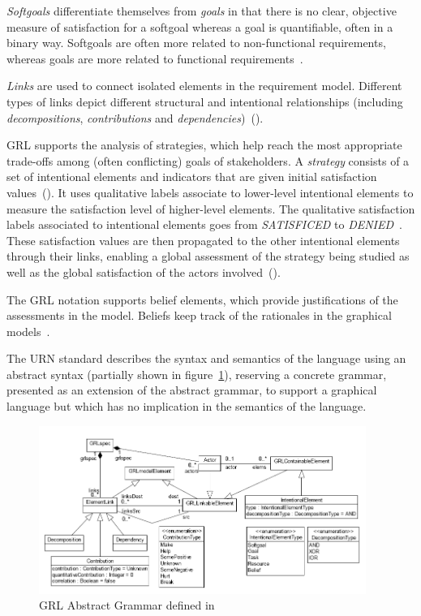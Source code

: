 \documentclass[dissertation,final]{softeng}
\begin{document}
\emph{Softgoals} differentiate themselves from \emph{goals} in that there is no clear, objective measure of satisfaction for a softgoal whereas a goal is quantifiable, often in a binary way. Softgoals are often more related to non-functional requirements, whereas goals are more related to functional requirements~\citep{amyot2011user}.

\emph{Links} are used to connect isolated elements in the requirement model. Different types of links depict different structural and intentional relationships (including \emph{decompositions}, \emph{contributions} and \emph{dependencies})~().

GRL supports the analysis of strategies, which help reach the most appropriate trade-offs among (often conflicting) goals of stakeholders. A \emph{strategy} consists of a set of intentional elements and indicators that are given initial satisfaction values~(). It uses qualitative labels associate to lower-level intentional elements to measure the satisfaction level of higher-level elements. The qualitative satisfaction labels associated to intentional elements goes from \emph{SATISFICED} to \emph{DENIED}~\citep{Roy:2007wyba}. These satisfaction values are then propagated to the other intentional elements through their links, enabling a global assessment of the strategy being studied as well as the global satisfaction of the actors involved~().

The GRL notation supports belief elements, which provide justifications of the assessments in the model. Beliefs keep track of the rationales in the graphical models~\citep{Roy:2007wyba}.

The URN standard describes the syntax and semantics of the language using an abstract syntax (partially shown in figure~\ref{fig:grl_abstract_grammar}), reserving a concrete grammar, presented as an extension of the abstract grammar, to support a graphical language but which has no implication in the semantics of the language.

\begin{figure}[h]
\includegraphics[width=0.95\textwidth]{grl_abstract_grammar}
\centering
\caption[GRL Abstract Grammar]{GRL Abstract Grammar defined in~}
\label{fig:grl_abstract_grammar}
\end{figure}
\end{document}
